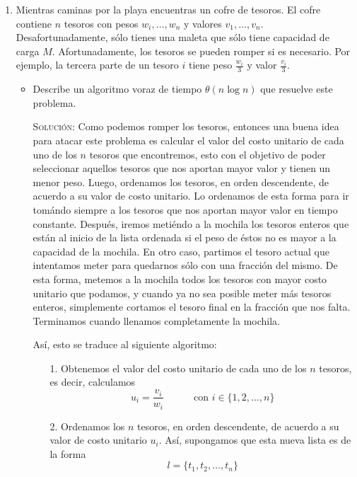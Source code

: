 \documentclass[letterpaper,11pt]{article}
\begin{document}
\begin{enumerate}
    \item Mientras caminas por la playa encuentras un cofre de tesoros. El 
    cofre contiene $n$ tesoros con pesos $w_i, \ldots, w_n$ y valores 
    $v_1, \ldots, v_n$. Desafortunadamente, sólo tienes una maleta que sólo 
    tiene capacidad de carga $M$. Afortunadamente, los tesoros se pueden romper
    si es necesario. Por ejemplo, la tercera parte de un tesoro $i$ tiene peso
    $\frac{w_i}{3}$ y valor $\frac{v_i}{3}$.
    \begin{itemize}
        \item Describe un algoritmo voraz de tiempo $\theta(n \log n)$ que 
        resuelve este problema.

        \textsc{Solución:} Como podemos romper los tesoros, entonces una buena 
        idea para atacar este problema es calcular el valor del costo unitario 
        de cada uno de los $n$ tesoros que encontremos, esto con el objetivo 
        de poder seleccionar aquellos tesoros que nos aportan mayor valor y 
        tienen un menor peso. Luego, ordenamos los tesoros, en orden 
        descendente, de acuerdo a su valor de costo unitario. Lo ordenamos de 
        esta forma para ir tomándo siempre a los tesoros que nos aportan 
        mayor valor en tiempo constante. Después, iremos metiéndo a la mochila 
        los tesoros enteros que están al inicio de la lista ordenada si el 
        peso de éstos no es mayor a la capacidad de la mochila. En otro caso, 
        partimos el tesoro actual que intentamos meter para quedarnos sólo con 
        una fracción del mismo. De esta forma, metemos a la mochila todos los 
        tesoros con mayor costo unitario que podamos, y cuando ya no sea posible
        meter más tesoros enteros, simplemente cortamos el tesoro final en la 
        fracción que nos falta. Terminamos cuando llenamos completamente la 
        mochila.

        Así, esto se traduce al siguiente algoritmo:
        \begin{itemize}
            \item[1.] Obtenemos el valor del costo unitario de cada uno de los 
            $n$ tesoros, es decir, calculamos 
            \begin{equation*}
                u_i = \frac{v_i}{w_i} \quad \quad \quad
                \text{con } i \in \{1, 2, \ldots, n\}
            \end{equation*}

            \item[2.] Ordenamos los $n$ tesoros, en orden descendente, de 
            acuerdo a su valor de costo unitario $u_i$. Así, supongamos que 
            esta nueva lista es de la forma 
            \begin{equation*}
                l = \{t_1, t_2, \ldots, t_n\}
            \end{equation*}


\end{itemize}
\end{itemize}
\end{enumerate}
\end{document}
